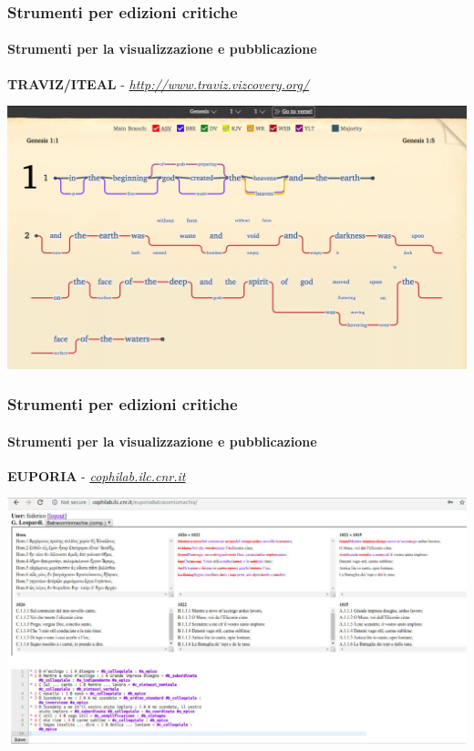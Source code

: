 \begin{frame}
    \frametitle{Strumenti per edizioni critiche}
    \framesubtitle{Strumenti per la visualizzazione e pubblicazione}
	\addtocounter{nframe}{1}
    \begin{center}
        \textbf{TRAVIZ/ITEAL} - \textit{\url{http://www.traviz.vizcovery.org/}}
    \end{center}
    \begin{center}
        \includegraphics[width=.95\textwidth]{imgs/traviz.png}
	\end{center}
\end{frame}

\begin{frame}
    \frametitle{Strumenti per edizioni critiche}
    \framesubtitle{Strumenti per la visualizzazione e pubblicazione}
    \addtocounter{nframe}{1}
    
    \begin{center}
        \textbf{EUPORIA} -  \textit{\url{cophilab.ilc.cnr.it}}
    \end{center}
    
    \begin{center}
        \includegraphics[width=.95\textwidth]{imgs/euporia.png}
	\end{center}
\end{frame}

